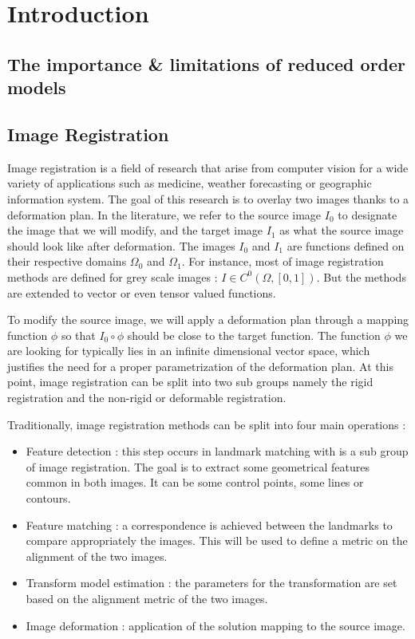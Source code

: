 \chapter{Introduction}



\section{The importance \& limitations of reduced order models}

\section{Image Registration}

Image registration is a field of research that arise from computer vision for a wide variety of applications such as medicine, weather forecasting or geographic information system. The goal of this research is to overlay two images thanks to a deformation plan. In the literature, we refer to the source image $I_0$ to designate the image that we will modify, and the target image $I_1$ as what the source image should look like after deformation. The images $I_0$ and $I_1$ are functions defined on their respective domains $\Omega_0$ and $\Omega_1$. For instance, most of image registration methods are defined for grey scale images : $I \in C^0(\Omega, [0, 1])$. But the methods are extended to vector or even tensor valued functions. 

To modify the source image, we will apply a deformation plan through a mapping function $\phi$ so that $I_0 \circ \phi$ should be close to the target function. The function $\phi$ we are looking for typically lies in an infinite dimensional vector space, which justifies the need for a proper parametrization of the deformation plan. At this point, image registration can be split into two sub groups namely the rigid registration and the non-rigid or deformable registration. 

Traditionally, image registration methods can be split into four main operations \cite{Zitova2003}:
\begin{itemize}
    \item Feature detection : this step occurs in landmark matching with is a sub group of image registration. The goal is to extract some geometrical features common in both images. It can be some control points, some lines or contours. 
    \item Feature matching : a correspondence is achieved between the landmarks to compare appropriately the images. This will be used to define a metric on the alignment of the two images. 
    \item  Transform model estimation : the parameters for the transformation are set based on the alignment metric of the two images. 
    \item Image deformation : application of the solution mapping to the source image. 
\end{itemize}

